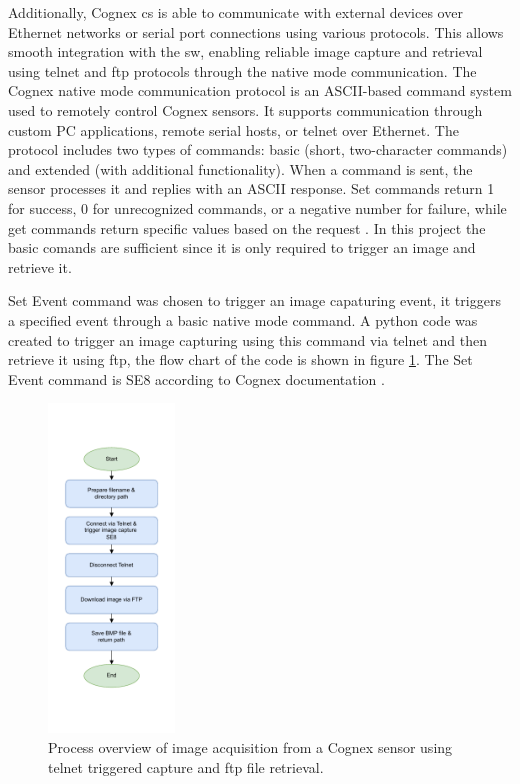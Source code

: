 Additionally, Cognex \gls{cs} is able to communicate with external devices over Ethernet networks or serial port connections using various protocols. This allows smooth integration with the \gls{sw}, enabling reliable image capture and retrieval using \gls{telnet} and \gls{ftp} protocols through the native mode communication. The Cognex native mode communication protocol is an ASCII-based command system used to remotely control Cognex sensors. It supports communication through custom PC applications, remote serial hosts, or \gls{telnet} over Ethernet. The protocol includes two types of commands: basic (short, two-character commands) and extended (with additional functionality). When a command is sent, the sensor processes it and replies with an ASCII response. Set commands return 1 for success, 0 for unrecognized commands, or a negative number for failure, while get commands return specific values based on the request \cite{Cognex_Com}. In this project the basic comands are sufficient since it is only required to trigger an image and retrieve it. 

Set Event command was chosen to trigger an image capaturing event, it triggers a specified event through a basic native mode command. A python code was created to trigger an image capturing using this command via \gls{telnet} and then retrieve it using \gls{ftp}, the flow chart of the code is shown in figure \ref{Image_capture_code}. The Set Event command is SE8 according to Cognex documentation \cite{Cognex_Com}.

\begin{figure}[!htb]
    \centering
    \includegraphics[width=0.3\textwidth]{Figures/diagrams/Image_Capturing.pdf}
    \caption{Process overview of image acquisition from a Cognex sensor using \gls{telnet} triggered capture and \gls{ftp} file retrieval.}
    \label{Image_capture_code}
\end{figure}

